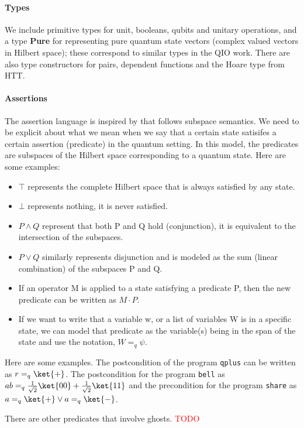 \documentclass[acmsmall,nonacm,timestamp,review=false,anonymous=false]{acmart}
\newcommand{\type}[1]{\textrm{\textbf{#1}}}
\newcommand{\todo}[1]{\textcolor{red}{#1}}
\begin{document}
\paragraph{Types} We include primitive types for unit, booleans, qubits and unitary operations, and a type \type{Pure} for representing pure quantum state vectors (complex valued vectors in Hilbert space); these correspond to similar types in the QIO work. There are also type constructors for pairs, dependent functions and the Hoare type from HTT.

\paragraph{Assertions}
The assertion language is inspired by \citet{unruh2019} that follows subspace semantics. We need to be explicit about what we mean when we say that a certain state satisifes a certain assertion (predicate) in the quantum setting. In this model, the predicates are subspaces of the Hilbert space corresponding to a quantum state. Here are some examples:
\begin{itemize}
	\item $\top$ represents the complete Hilbert space that is always satisfied by any state.
	\item $\bot$ represents nothing, it is never satisfied.
	\item $P \wedge Q$ represent that both P and Q hold (conjunction), it is equivalent to the intersection of the subspaces.
	\item $P \vee Q$ similarly represents disjunction and is modeled as the sum (linear combination) of the subspaces P and Q.
	\item If an operator M is applied to a state satisfying a predicate P, then the new predicate can be written as $M \cdot P$.
	\item If we want to write that a variable w, or a list of variables W is in a specific state, we can model that predicate as the variable(s) being in the span of the state and use the notation, $W =_q \psi$.
\end{itemize}

Here are some examples. The postcondition of the program \texttt{qplus} can be written as $r =_q \ket{+}$. The postcondition for the program \texttt{bell} as $ab =_q \frac{1}{\sqrt{2}}\ket{00}+\frac{1}{\sqrt{2}}\ket{11}$ and the precondition for the program \texttt{share} as $a =_q \ket{+} \vee a =_q \ket{-}$.

There are other predicates that involve ghosts. \todo{TODO}
\end{document}
